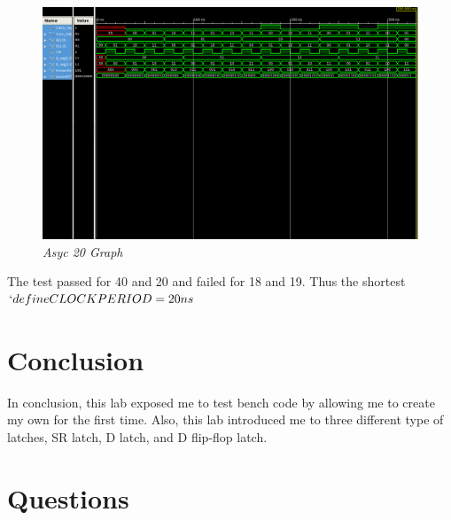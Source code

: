 \documentclass[a4paper,12pt]{article}
\begin{document}
  \newpage
  
  \begin{figure}[h]
    \begin{center}
      \includegraphics[scale=0.3]{asyc_20_graph.png}
      \caption{\textit{Asyc 20 Graph}}
    \end{center}
  \end{figure}
  
  The test passed for 40 and 20 and failed for 18 and 19. Thus the shortest
  $`define CLOCK PERIOD = 20ns$
  
\section*{Conclusion}

  \hspace{15pt}In conclusion, this lab exposed me to test bench code by
  allowing me to create my own for the first time. Also, this lab introduced
  me to three different type of latches, SR latch, D latch, and D flip-flop latch.

\section*{Questions}
\end{document}
